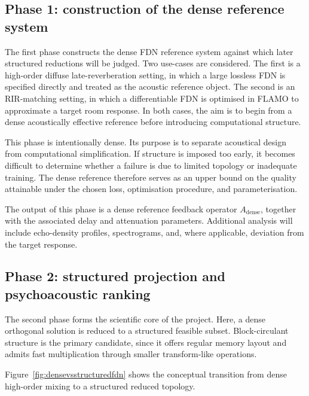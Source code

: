 \documentclass[12pt,a4paper]{article}
\begin{document}
\subsection{Phase 1: construction of the dense reference system}

The first phase constructs the dense FDN reference system against which later
structured reductions will be judged. Two use-cases are considered. The first
is a high-order diffuse late-reverberation setting, in which a large lossless
FDN is specified directly and treated as the acoustic reference object. The
second is an RIR-matching setting, in which a differentiable FDN is optimised
in FLAMO to approximate a target room response. In both cases, the aim is to
begin from a dense acoustically effective reference before introducing
computational structure.

This phase is intentionally dense. Its purpose is to separate acoustical
design from computational simplification. If structure is imposed too
early, it becomes difficult to determine whether a failure is due to limited
topology or inadequate training. The dense reference therefore serves as an
upper bound on the quality attainable under the chosen loss, optimisation
procedure, and parameterisation.

The output of this phase is a dense reference feedback operator
$A_{\mathrm{dense}}$, together with the associated delay and attenuation
parameters. Additional analysis will include echo-density profiles,
spectrograms, and, where applicable, deviation from the target response.

\subsection{Phase 2: structured projection and psychoacoustic ranking}

The second phase forms the scientific core of the project. Here, a dense
orthogonal solution is reduced to a structured feasible subset. Block-circulant
structure is the primary candidate, since it offers regular memory layout and
admits fast multiplication through smaller transform-like operations.






Figure~\ref{fig:densevsstructuredfdn} shows the conceptual transition from dense high-order mixing to a structured reduced topology.
\end{document}
